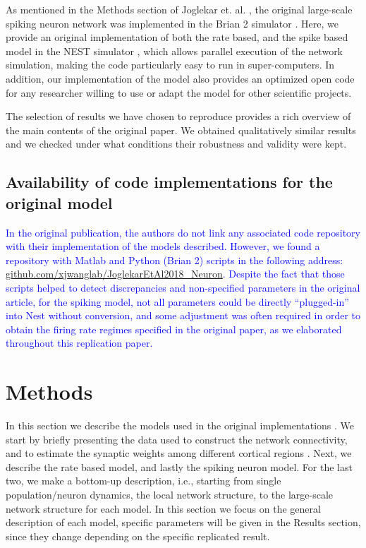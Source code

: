 \indent As mentioned in the Methods section of Joglekar et. al. \cite{joglekar2018inter}, the original large-scale spiking neuron network was implemented in the Brian 2 simulator \cite{stimberg2019brian}. Here, we provide an original implementation of both the rate based, and the spike based model in the NEST simulator \cite{gewaltig2007nest, jordan2019nest}, which allows parallel execution of the network simulation, making the code particularly easy to run in super-computers. 
In addition, our implementation of the model also provides an optimized open code for any researcher willing to use or adapt the model for other scientific projects.

The selection of results we have chosen to reproduce provides a rich overview of the main contents of the original paper. We obtained qualitatively similar results and we checked under what conditions their robustness and validity were kept.  


\subsection*{Availability of code implementations for the original model}\label{methods}
\textcolor{blue}{In the original publication, the authors do not link any associated code repository with their implementation of the models described. However, we found a repository with Matlab and Python (Brian 2) scripts in the following address:  \href{github.com/xjwanglab/JoglekarEtAl2018_Neuron}{github.com/xjwanglab/JoglekarEtAl2018\_Neuron}. Despite the fact that those scripts helped to detect discrepancies and non-specified parameters in the original article, for the spiking model, not all parameters could be directly ``plugged-in'' into Nest without conversion, and some adjustment was often required in order to obtain the firing rate regimes specified in the original paper, as we elaborated throughout this replication paper.}

\section{Methods}\label{methods}

In this section we describe the models used in the original implementations \cite{joglekar2018inter}. We start by briefly presenting the data used to construct the network connectivity, and to estimate the synaptic weights among different cortical regions \cite{markov2014b}. Next, we describe the rate based model, and lastly the spiking neuron model. For the last two, we make a bottom-up description, i.e., starting from single population/neuron dynamics, the local network structure, to the large-scale network structure for each model. In this section we focus on the general description of each model, specific parameters will be given in the Results section, since they change depending on the specific replicated result.

